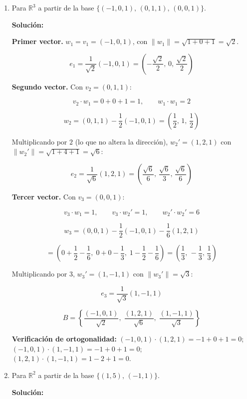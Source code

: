 \documentclass[12pt]{article}
\newcommand{\solucion}{%
    \vspace{0.8em}%
    \textbf{Solución:}%
    \vspace{0.8em}%
}
\begin{document}
\begin{enumerate}[label=\alph*.-]

    \item Para $\mathbb{R}^3$ a partir de la base
    $\{(-1,0,1),\,(0,1,1),\,(0,0,1)\}$.

    \solucion

    \textbf{Primer vector.} $w_1=v_1=(-1,0,1)$, con
    $\|w_1\|=\sqrt{1+0+1}=\sqrt{2}$.

    \[
    e_1=\frac{1}{\sqrt{2}}(-1,0,1)
    =\left(-\frac{\sqrt{2}}{2},\,0,\,\frac{\sqrt{2}}{2}\right)
    \]

    \textbf{Segundo vector.} Con $v_2=(0,1,1)$:

    \[
    v_2\cdot w_1=0+0+1=1,\qquad w_1\cdot w_1=2
    \]

    \[
    w_2=(0,1,1)-\frac{1}{2}(-1,0,1)
    =\left(\frac{1}{2},\,1,\,\frac{1}{2}\right)
    \]

    Multiplicando por $2$ (lo que no altera la dirección),
    $w_2'=(1,2,1)$ con $\|w_2'\|=\sqrt{1+4+1}=\sqrt{6}$:

    \[
    e_2=\frac{1}{\sqrt{6}}(1,2,1)
    =\left(\frac{\sqrt{6}}{6},\,\frac{\sqrt{6}}{3},\,\frac{\sqrt{6}}{6}\right)
    \]

    \textbf{Tercer vector.} Con $v_3=(0,0,1)$:

    \[
    v_3\cdot w_1=1,\qquad v_3\cdot w_2'=1,\qquad w_2'\cdot w_2'=6
    \]

    \[
    w_3=(0,0,1)-\frac{1}{2}(-1,0,1)-\frac{1}{6}(1,2,1)
    \]

    \[
    =\left(0+\frac{1}{2}-\frac{1}{6},\;0+0-\frac{1}{3},\;
    1-\frac{1}{2}-\frac{1}{6}\right)
    =\left(\frac{1}{3},\,-\frac{1}{3},\,\frac{1}{3}\right)
    \]

    Multiplicando por $3$, $w_3'=(1,-1,1)$ con $\|w_3'\|=\sqrt{3}$:

    \[
    e_3=\frac{1}{\sqrt{3}}(1,-1,1)
    \]

    \[
    \boxed{
    B=\left\{
    \frac{(-1,0,1)}{\sqrt{2}},\;
    \frac{(1,2,1)}{\sqrt{6}},\;
    \frac{(1,-1,1)}{\sqrt{3}}
    \right\}
    }
    \]

    \textbf{Verificación de ortogonalidad:}
    $(-1,0,1)\cdot(1,2,1)=-1+0+1=0$;
    $(-1,0,1)\cdot(1,-1,1)=-1+0+1=0$;
    $(1,2,1)\cdot(1,-1,1)=1-2+1=0$. \checkmark

    \item Para $\mathbb{R}^2$ a partir de la base $\{(1,5),\,(-1,1)\}$.

    \solucion


\end{enumerate}
\end{document}
